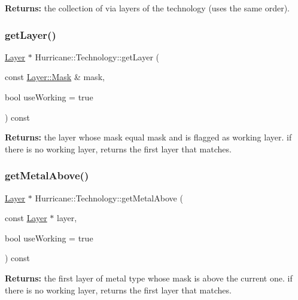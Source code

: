 {\bfseries Returns\+:} the collection of via layers of the technology (uses the same order). \mbox{\label{classHurricane_1_1Technology_a2ab8d2c386bf3daeb2b93d92ecbac6b4}} 
\subsubsection{\texorpdfstring{get\+Layer()}{getLayer()}\hspace{0.1cm}{\footnotesize\ttfamily [2/2]}}
{\footnotesize\ttfamily \mbox{\hyperlink{classHurricane_1_1Layer}{Layer}} $\ast$ Hurricane\+::\+Technology\+::get\+Layer (\begin{DoxyParamCaption}\item[{const \mbox{\hyperlink{classHurricane_1_1Layer_af5277c670637bd5d910237e7afe01a91}{Layer\+::\+Mask}} \&}]{mask,  }\item[{bool}]{use\+Working = {\ttfamily true} }\end{DoxyParamCaption}) const}

{\bfseries Returns\+:} the layer whose mask equal {\ttfamily mask} and is flagged as working layer. if there is no working layer, returns the first layer that matches. \mbox{\label{classHurricane_1_1Technology_af5723b08c9d289ffef8159ac2ea71b74}} 
\subsubsection{\texorpdfstring{get\+Metal\+Above()}{getMetalAbove()}}
{\footnotesize\ttfamily \mbox{\hyperlink{classHurricane_1_1Layer}{Layer}} $\ast$ Hurricane\+::\+Technology\+::get\+Metal\+Above (\begin{DoxyParamCaption}\item[{const \mbox{\hyperlink{classHurricane_1_1Layer}{Layer}} $\ast$}]{layer,  }\item[{bool}]{use\+Working = {\ttfamily true} }\end{DoxyParamCaption}) const}

{\bfseries Returns\+:} the first layer of metal type whose mask is above the current one. if there is no working layer, returns the first layer that matches. \mbox{\label{classHurricane_1_1Technology_ae02123406c7362cc14413727e8689d5a}} 
